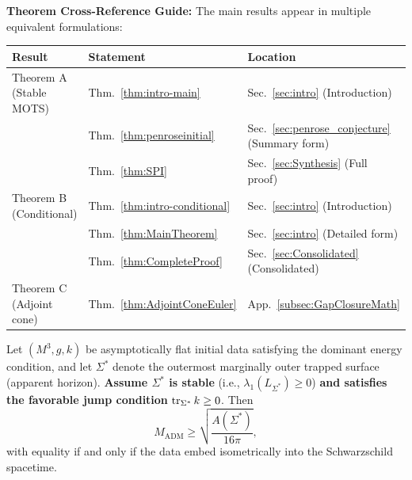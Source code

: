\textbf{Theorem Cross-Reference Guide:} The main results appear in multiple equivalent formulations:
\begin{center}
\begin{tabular}{|l|l|l|}
\hline
\textbf{Result} & \textbf{Statement} & \textbf{Location} \\
\hline
Theorem A (Stable MOTS) & Thm.~\ref{thm:intro-main} & Sec.~\ref{sec:intro} (Introduction) \\
& Thm.~\ref{thm:penroseinitial} & Sec.~\ref{sec:penrose_conjecture} (Summary form) \\
& Thm.~\ref{thm:SPI} & Sec.~\ref{sec:Synthesis} (Full proof) \\
\hline
Theorem B (Conditional) & Thm.~\ref{thm:intro-conditional} & Sec.~\ref{sec:intro} (Introduction) \\
& Thm.~\ref{thm:MainTheorem} & Sec.~\ref{sec:intro} (Detailed form) \\
& Thm.~\ref{thm:CompleteProof} & Sec.~\ref{sec:Consolidated} (Consolidated) \\
\hline
Theorem C (Adjoint cone) & Thm.~\ref{thm:AdjointConeEuler} & App.~\ref{subsec:GapClosureMath} \\
\hline
\end{tabular}
\end{center}

\begin{theorem}\label{thm:intro-main}
Let $(M^3, g, k)$ be asymptotically flat initial data satisfying the dominant energy condition, and let $\Sigma^*$ denote the outermost marginally outer trapped surface (apparent horizon). \textbf{Assume $\Sigma^*$ is stable} (i.e., $\lambda_1(L_{\Sigma^*}) \geq 0$) \textbf{and satisfies the favorable jump condition} $\operatorname{tr}_{\Sigma^*} k \ge 0$. Then
\begin{equation*}
    M_{\mathrm{ADM}} \geq \sqrt{\frac{A(\Sigma^*)}{16\pi}},
\end{equation*}
with equality if and only if the data embed isometrically into the Schwarzschild spacetime.
\end{theorem}

